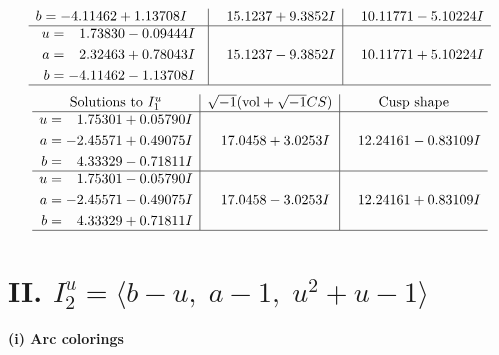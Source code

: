 \documentclass[1p]{elsarticle_modified}
\theoremstyle{definition}
\newcommand{\I}{\sqrt{-1}}
\begin{document}
$$\begin{array}{c|c|c}
\begin{aligned}
b &= -4.11462 + 1.13708 I\end{aligned}
 & \phantom{-}15.1237 + 9.3852 I & \phantom{-}10.11771 - 5.10224 I \\ \hline\begin{aligned}
u &= \phantom{-}1.73830 - 0.09444 I \\
a &= \phantom{-}2.32463 + 0.78043 I \\
b &= -4.11462 - 1.13708 I\end{aligned}
 & \phantom{-}15.1237 - 9.3852 I & \phantom{-}10.11771 + 5.10224 I\\
 \hline 
 \end{array}$$\newpage$$\begin{array}{c|c|c}  
\text{Solutions to }I^u_{1}& \I (\text{vol} + \sqrt{-1}CS) & \text{Cusp shape}\\
 \hline 
\begin{aligned}
u &= \phantom{-}1.75301 + 0.05790 I \\
a &= -2.45571 + 0.49075 I \\
b &= \phantom{-}4.33329 - 0.71811 I\end{aligned}
 & \phantom{-}17.0458 + 3.0253 I & \phantom{-}12.24161 - 0.83109 I \\ \hline\begin{aligned}
u &= \phantom{-}1.75301 - 0.05790 I \\
a &= -2.45571 - 0.49075 I \\
b &= \phantom{-}4.33329 + 0.71811 I\end{aligned}
 & \phantom{-}17.0458 - 3.0253 I & \phantom{-}12.24161 + 0.83109 I\\
 \hline 
 \end{array}$$\newpage\newpage\renewcommand{\arraystretch}{1}
\centering \section*{II. $I^u_{2}= \langle b- u,\;a-1,\;u^2+u-1 \rangle$}
\flushleft \textbf{(i) Arc colorings}\\
\end{document}
